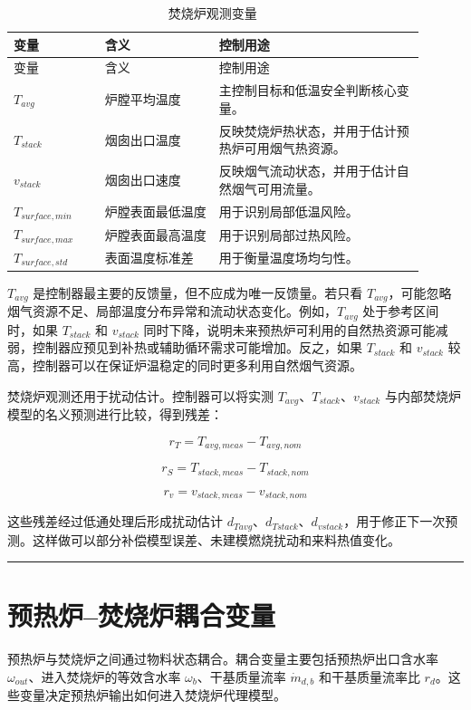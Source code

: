 \documentclass[UTF8,openany,zihao=-4,oneside]{ctexbook}
\newcommand{\manualdivider}{\par\vspace{0.6em}\noindent\textcolor{FGLine}{\rule{\linewidth}{0.7pt}}\vspace{0.6em}\par}
\begin{document}
\begin{longtable}{@{}p{0.20\linewidth}p{0.25\linewidth}p{0.45\linewidth}@{}}
\caption{焚烧炉观测变量}\label{tab:furnace-vars}\\
\toprule
变量 & 含义 & 控制用途 \\
\midrule
\endfirsthead
\toprule
变量 & 含义 & 控制用途 \\
\midrule
\endhead
\(T_{avg}\) & 炉膛平均温度 & 主控制目标和低温安全判断核心变量。 \\
\(T_{stack}\) & 烟囱出口温度 & 反映焚烧炉热状态，并用于估计预热炉可用烟气热资源。 \\
\(v_{stack}\) & 烟囱出口速度 & 反映烟气流动状态，并用于估计自然烟气可用流量。 \\
\(T_{surface,min}\) & 炉膛表面最低温度 & 用于识别局部低温风险。 \\
\(T_{surface,max}\) & 炉膛表面最高温度 & 用于识别局部过热风险。 \\
\(T_{surface,std}\) & 表面温度标准差 & 用于衡量温度场均匀性。 \\
\bottomrule
\end{longtable}

\(T_{avg}\) 是控制器最主要的反馈量，但不应成为唯一反馈量。若只看 \(T_{avg}\)，可能忽略烟气资源不足、局部温度分布异常和流动状态变化。例如，\(T_{avg}\) 处于参考区间时，如果 \(T_{stack}\) 和 \(v_{stack}\) 同时下降，说明未来预热炉可利用的自然热资源可能减弱，控制器应预见到补热或辅助循环需求可能增加。反之，如果 \(T_{stack}\) 和 \(v_{stack}\) 较高，控制器可以在保证炉温稳定的同时更多利用自然烟气资源。

焚烧炉观测还用于扰动估计。控制器可以将实测 \(T_{avg}\)、\(T_{stack}\)、\(v_{stack}\) 与内部焚烧炉模型的名义预测进行比较，得到残差：

\[
r_T=T_{avg,meas}-T_{avg,nom}
\]

\[
r_S=T_{stack,meas}-T_{stack,nom}
\]

\[
r_v=v_{stack,meas}-v_{stack,nom}
\]

这些残差经过低通处理后形成扰动估计 \(d_{Tavg}\)、\(d_{Tstack}\)、\(d_{vstack}\)，用于修正下一次预测。这样做可以部分补偿模型误差、未建模燃烧扰动和来料热值变化。

\manualdivider

\section{预热炉--焚烧炉耦合变量}\label{sec:coupling-vars}

预热炉与焚烧炉之间通过物料状态耦合。耦合变量主要包括预热炉出口含水率 \(\omega_{out}\)、进入焚烧炉的等效含水率 \(\omega_b\)、干基质量流率 \(\dot m_{d,b}\) 和干基质量流率比 \(r_d\)。这些变量决定预热炉输出如何进入焚烧炉代理模型。
\end{document}
